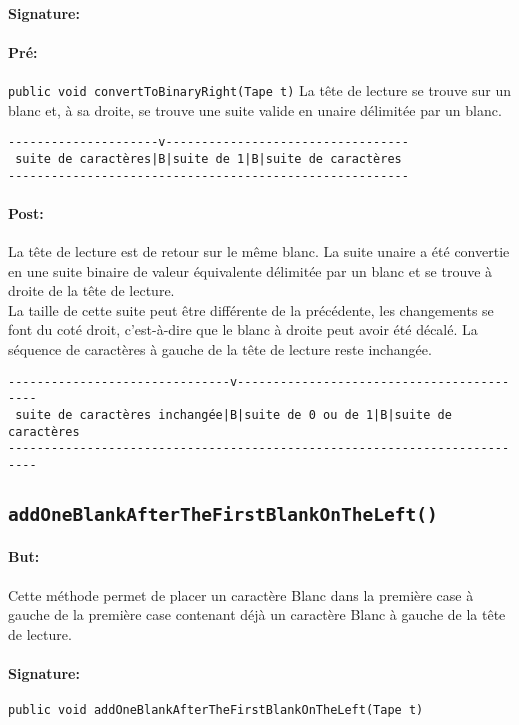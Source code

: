 \documentclass[a4paper,11pt]{article}
\begin{document}
\paragraph{Signature:}
\paragraph{Pré:} \texttt{public void convertToBinaryRight(Tape t)}
La tête de lecture se trouve sur un blanc et, à sa droite, se trouve une suite valide en unaire délimitée par un blanc.
\begin{verbatim}
---------------------v----------------------------------
 suite de caractères|B|suite de 1|B|suite de caractères
--------------------------------------------------------
\end{verbatim}
\paragraph{Post:}
La tête de lecture est de retour sur le même blanc. La suite unaire a été convertie en une suite binaire de valeur équivalente délimitée par un blanc et se trouve à droite de la tête de lecture.\\
La taille de cette suite peut être différente de la précédente, les changements se font du coté droit, c'est-à-dire que le blanc à droite peut avoir été décalé. La séquence de caractères à gauche de la tête de lecture reste inchangée.
\begin{verbatim}
-------------------------------v------------------------------------------
 suite de caractères inchangée|B|suite de 0 ou de 1|B|suite de caractères
--------------------------------------------------------------------------
\end{verbatim}
\subsection{\texttt{addOneBlankAfterTheFirstBlankOnTheLeft()}}
\paragraph{But:} Cette méthode permet de placer un caractère Blanc dans la première case à gauche de la première case contenant déjà un caractère Blanc à gauche de la tête de lecture.
\paragraph{Signature:} \texttt{public void addOneBlankAfterTheFirstBlankOnTheLeft(Tape t)}
\end{document}
